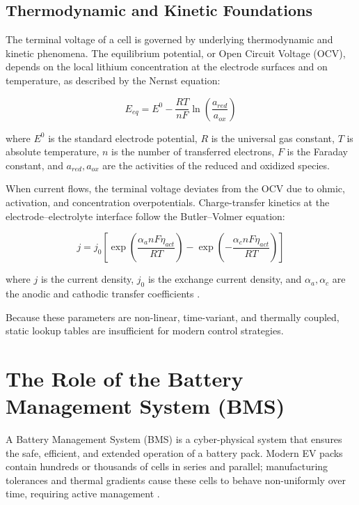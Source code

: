 \subsection{Thermodynamic and Kinetic Foundations}

The terminal voltage of a cell is governed by underlying thermodynamic and kinetic phenomena. The equilibrium potential, or Open Circuit Voltage (OCV), depends on the local lithium concentration at the electrode surfaces and on temperature, as described by the Nernst equation:

\begin{equation}
\label{eq:nernst}
E_{eq} = E^0 - \frac{RT}{nF} \ln\!\left(\frac{a_{red}}{a_{ox}}\right)
\end{equation}

\noindent where $E^0$ is the standard electrode potential, $R$ is the universal gas constant, $T$ is absolute temperature, $n$ is the number of transferred electrons, $F$ is the Faraday constant, and $a_{red}, a_{ox}$ are the activities of the reduced and oxidized species.

When current flows, the terminal voltage deviates from the OCV due to ohmic, activation, and concentration overpotentials. Charge-transfer kinetics at the electrode--electrolyte interface follow the Butler--Volmer equation:

\begin{equation}
\label{eq:butler_volmer}
j = j_0 \left[ \exp\!\left(\frac{\alpha_a n F \eta_{act}}{RT}\right) - \exp\!\left(-\frac{\alpha_c n F \eta_{act}}{RT}\right) \right]
\end{equation}

\noindent where $j$ is the current density, $j_0$ is the exchange current density, and $\alpha_a,\alpha_c$ are the anodic and cathodic transfer coefficients \cite{newman1993lithium}.

Because these parameters are non-linear, time-variant, and thermally coupled, static lookup tables are insufficient for modern control strategies.

\section{The Role of the Battery Management System (BMS)}
\label{sec:bms_role}

A Battery Management System (BMS) is a cyber-physical system that ensures the safe, efficient, and extended operation of a battery pack. Modern EV packs contain hundreds or thousands of cells in series and parallel; manufacturing tolerances and thermal gradients cause these cells to behave non-uniformly over time, requiring active management \cite{lu2013review}.

